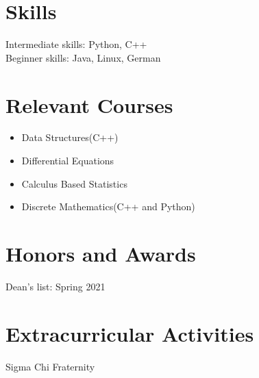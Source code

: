\documentclass{res}
\begin{document}
\begin{resume}
\section{Skills}          
    Intermediate skills: Python, C++\\
    Beginner skills: Java, Linux, German
    
\section{Relevant Courses}
	\begin{itemize}
		\item Data Structures(C++)
		\item Differential Equations
		\item Calculus Based Statistics
		\item Discrete Mathematics(C++ and Python)    
	\end{itemize}  
 
\section{Honors and Awards}          
    Dean's list: Spring 2021         
 
\section{Extracurricular Activities}     
    Sigma Chi Fraternity         
 
\end{resume}
\end{document}
